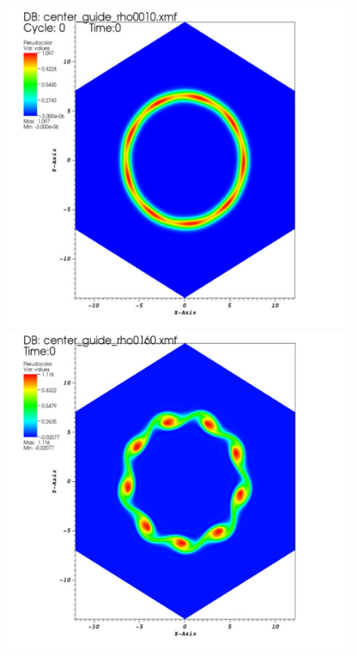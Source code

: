 \documentclass[proc]{edpsmath}
\begin{document}
\begin{figure}[h!]
	\includegraphics[scale=0.15]{figures/gc_spl_1.png}
	\includegraphics[scale=0.15]{figures/gc_spl_2.png}

\end{figure}
\end{document}
